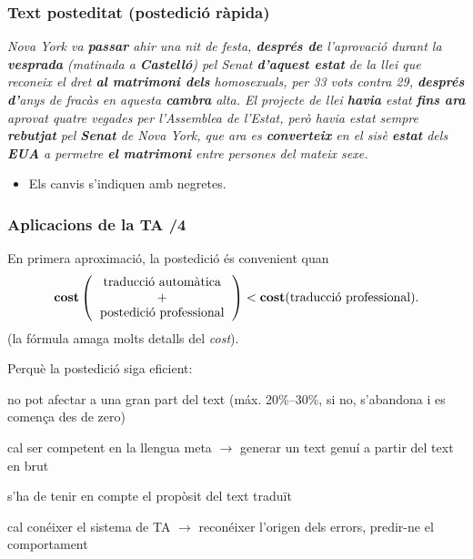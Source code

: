 \documentclass{beamer}
\newcommand{\empha}[1]{\emph{#1}\/}
\begin{document}
\begin{frame}
  \frametitle{Text posteditat (postedició ràpida)}

  \empha{Nova York va \textbf{passar} ahir una nit de festa,
    \textbf{després de} l'aprovació durant la \textbf{vesprada}
    (matinada a \textbf{Castelló}) pel Senat \textbf{d'aquest estat}
    de la llei que reconeix el dret \textbf{al matrimoni dels}
    homosexuals, per 33 vots contra 29, \textbf{després d'}anys de
    fracàs en aquesta \textbf{cambra} alta.  El projecte de llei
    \textbf{havia} estat \textbf{fins ara} aprovat quatre vegades per
    l'Assemblea de l'Estat, però havia estat sempre \textbf{rebutjat}
    pel \textbf{Senat} de Nova York, que ara es \textbf{converteix} en
    el sisè \textbf{estat} dels \textbf{EUA} a permetre \textbf{el
      matrimoni} entre persones del mateix sexe.}

  \begin{itemize}
  \item Els canvis s'indiquen amb negretes.
  \end{itemize}
\end{frame}


\begin{frame}
\frametitle{ Aplicacions de la TA /4}

{
{En primera aproximació, la postedició és convenient quan 
$$\textbf{cost}\left(\mbox{\begin{tabular}{c}traducció automàtica\\ +\\
  postedició professional\end{tabular}}\right) < \textbf{cost}(\mbox{traducció professional}).  
$$
(la fórmula amaga molts detalls del \empha{cost}).
}

{Perquè la postedició siga eficient:}
\begin{itemize}\setlength{\itemsep}{0pt}
{\item no pot afectar a una gran part del text (máx. 20\%--30\%, si no, s'abandona i es comença des de zero)}
{\item cal ser competent en la llengua meta $\to$ generar un
  text genuí a partir del text en brut}
{\item s'ha de tenir en compte el propòsit del text traduït}
{\item cal conéixer el sistema de TA $\to$ reconéixer l'origen dels
  errors, predir-ne el comportament}
\end{itemize}
}
\end{frame}
\end{document}

